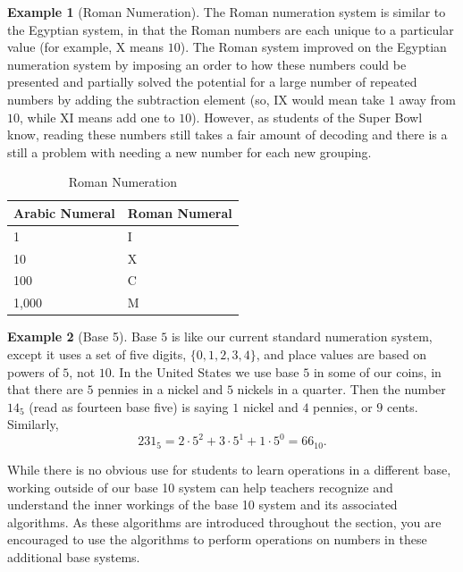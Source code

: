 \documentclass[
]{book}
\theoremstyle{definition}
\theoremstyle{definition}
\newtheorem{example}{Example}[chapter]
\theoremstyle{definition}
\theoremstyle{definition}
\theoremstyle{remark}
\begin{document}
\begin{example}[Roman Numeration]

The Roman numeration system is similar to the Egyptian system, in that the Roman numbers are each unique to a particular value (for example, X means \(10\)). The Roman system improved on the Egyptian numeration system by imposing an order to how these numbers could be presented and partially solved the potential for a large number of repeated numbers by adding the subtraction element (so, IX would mean take \(1\) away from \(10\), while XI means add one to \(10\)). However, as students of the Super Bowl know, reading these numbers still takes a fair amount of decoding and there is a still a problem with needing a new number for each new grouping.

\begin{table}

\caption{\label{tab:roman}Roman Numeration}
\centering
\begin{tabular}[t]{l|l}
\hline
Arabic Numeral & Roman Numeral\\
\hline
1 & I\\
\hline
10 & X\\
\hline
100 & C\\
\hline
1,000 & M\\
\hline
\end{tabular}
\end{table}

\end{example}

\begin{example}[Base 5]
Base \(5\) is like our current standard numeration system, except it uses a set of five digits, \(\{0,1,2,3,4\}\), and place values are based on powers of \(5\), not \(10\). In the United States we use base \(5\) in some of our coins, in that there are \(5\) pennies in a nickel and \(5\) nickels in a quarter. Then the number \(14_{5}\) (read as fourteen base five) is saying \(1\) nickel and \(4\) pennies, or \(9\) cents. Similarly,
\[231_{5} = 2\cdot 5^2 + 3\cdot 5^1 + 1 \cdot 5^0 = 66_{10}.\]
\end{example}

While there is no obvious use for students to learn operations in a different base, working outside of our base 10 system can help teachers recognize and understand the inner workings of the base 10 system and its associated algorithms. As these algorithms are introduced throughout the section, you are encouraged to use the algorithms to perform operations on numbers in these additional base systems.
\end{document}
